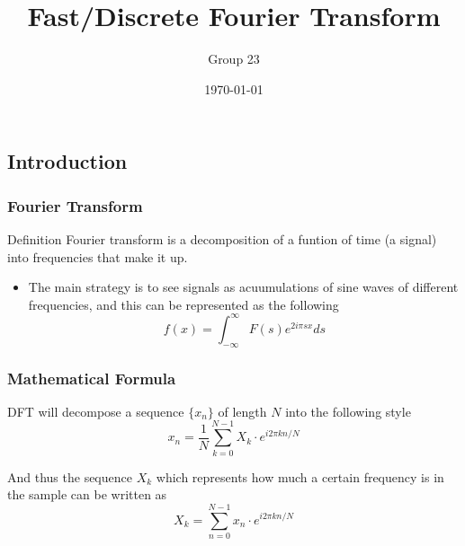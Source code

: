\documentclass{beamer}
\title{Fast/Discrete Fourier Transform}
\author{Group 23}
\institute{UM-SJTU Joint Institute}
\date{\today}
\begin{document}
\begin{frame}
	\titlepage
\end{frame}

\begin{frame}
	\tableofcontents
\end{frame}


\begin{frame}
	\section{Introduction}
	\frametitle{Fourier Transform}
	\begin{block}{Definition}
		Fourier transform is a decomposition of a funtion of time (a signal) into frequencies that make it up.
    \end{block}
    \begin{itemize}
        \item The main strategy is to see signals as acuumulations of sine waves of different frequencies, and this can be represented as the following $$f(x) = \int_{-\infty}^{\infty}F(s)e^{2i\pi sx} ds$$
    \end{itemize}
\end{frame}


\begin{frame}
	\frametitle{Mathematical Formula}
    DFT will decompose a sequence $\{x_n\}$ of length $N$ into the following style $$x_n = \frac{1}{N}\sum_{k=0}^{N-1}X_k\cdot e^{i2\pi kn/N}$$

    And thus the sequence $X_k$ which represents how much a certain frequency is in the sample can be written as $$X_k = \sum_{n=0}^{N-1}x_n\cdot e^{i2\pi kn/N}$$
\end{frame}
\end{document}
